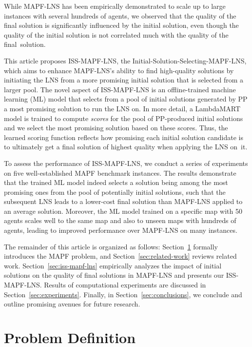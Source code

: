\documentclass[runningheads]{llncs}
\begin{document}
While MAPF-LNS has been empirically demonstrated to scale up to large instances with several hundreds of agents, we observed that the quality of the final solution is significantly influenced by the initial solution, even though the quality of the initial solution is not correlated much with the quality of the final~solution. 

This article proposes ISS-MAPF-LNS, the Initial-Solution-Selecting-MAPF-LNS, which aims to enhance MAPF-LNS's ability to find high-quality solutions by initiating the LNS from a more promising initial solution that is selected from a larger pool. The novel aspect of ISS-MAPF-LNS is an offline-trained machine learning (ML) model that selects from a pool of initial solutions generated by PP a most promising solution to run the LNS on. In more detail, a LambdaMART~\cite{burges-2010} model is trained to compute \emph{scores} for the pool of PP-produced initial solutions and we select the most promising solution based on these scores. Thus, the learned scoring function reflects how promising each initial solution candidate is to ultimately get a final solution of highest quality when applying the LNS on~it.

To assess the performance of ISS-MAPF-LNS, we conduct a series of experiments on five well-established MAPF benchmark instances. The results demonstrate that the trained ML model indeed selects a solution being among the most promising ones from the pool of potentially initial solutions, such that the subsequent LNS leads to a lower-cost final solution than MAPF-LNS applied to an average solution. Moreover, the ML model trained on a specific map with 50 agents scales well to the same map and also to unseen maps with hundreds of agents, leading to improved performance over MAPF-LNS on many instances.

The remainder of this article is organized as follows: Section~\ref{sec:problem-definition} formally introduces the MAPF problem, and Section~\ref{sec:related-work} reviews related work. Section~\ref{sec:iss-mapf-lns} empirically analyzes the impact of initial solutions on the quality of final solutions in MAPF-LNS and presents our ISS-MAPF-LNS. Results of computational experiments are discussed in Section~\ref{sec:experiments}. Finally, in Section~\ref{sec:conclusions}, we conclude and outline promising avenues for future research.


\section{Problem Definition} \label{sec:problem-definition}
\end{document}
